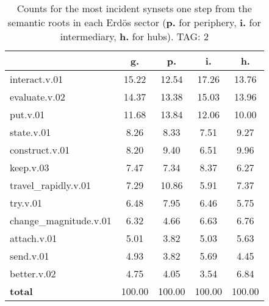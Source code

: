\begin{table}[h!]
\begin{center}
\begin{tabular}{| l || c | c | c | c |}\hline
 & {\bf g.} & {\bf p.} & {\bf i.} & {\bf h.} \\\hline\hline
interact.v.01 & 15.22  & 12.54  & 17.26  & 13.76 \\\hline
evaluate.v.02 & 14.37  & 13.38  & 15.03  & 13.96 \\\hline
put.v.01 & 11.68  & 13.84  & 12.06  & 10.00 \\\hline
state.v.01 & 8.26  & 8.33  & 7.51  & 9.27 \\\hline
construct.v.01 & 8.20  & 9.40  & 6.51  & 9.96 \\\hline
keep.v.03 & 7.47  & 7.34  & 8.37  & 6.27 \\\hline
travel\_rapidly.v.01 & 7.29  & 10.86  & 5.91  & 7.37 \\\hline
try.v.01 & 6.48  & 7.95  & 6.46  & 5.75 \\\hline
change\_magnitude.v.01 & 6.32  & 4.66  & 6.63  & 6.76 \\\hline
attach.v.01 & 5.01  & 3.82  & 5.03  & 5.63 \\\hline
send.v.01 & 4.93  & 3.82  & 5.69  & 4.45 \\\hline
better.v.02 & 4.75  & 4.05  & 3.54  & 6.84 \\\hline\hline
{{\bf total}} & 100.00  & 100.00  & 100.00  & 100.00 \\\hline
\end{tabular}
\caption{Counts for the most incident synsets one step from the semantic roots in each Erd\"os sector ({\bf p.} for periphery, {\bf i.} for intermediary, {\bf h.} for hubs). TAG: 2}
\end{center}
\end{table}